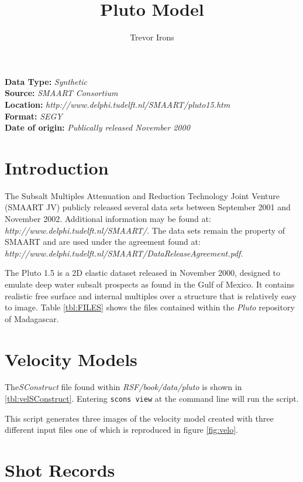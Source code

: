 \title{Pluto Model}
\author{Trevor Irons}

\maketitle
\lstset{language=python,numbers=left,numberstyle=\tiny,showstringspaces=false}
\textbf {Data Type:} \emph{Synthetic}\\
\textbf {Source:} \emph{SMAART Consortium}\\
\textbf {Location:} \emph{http://www.delphi.tudelft.nl/SMAART/pluto15.htm}\\
\textbf {Format:} \emph{SEGY} \\
\textbf{Date of origin:} \emph{Publically released November 2000}\\

\section{Introduction} 
The Subsalt Multiples Attenuation and Reduction Technology Joint Venture (SMAART JV) publicly released several data sets between September 2001 and November 2002.  Additional information may be found at: \emph{http://www.delphi.tudelft.nl/SMAART/}.  The data sets remain the property of SMAART and are used under the agreement found at: \emph{http://www.delphi.tudelft.nl/SMAART/DataReleaseAgreement.pdf}.

The Pluto 1.5 is a 2D elastic dataset released in November 2000, designed to emulate deep water subsalt prospects as found in the Gulf of Mexico. It contains realistic free surface and internal multiples over a structure that is relatively easy to image. Table \ref{tbl:FILES} shows the files contained within the \emph{Pluto} repository of Madagascar.  
 
{
\tiny

\normalsize
}

\section{Velocity Models}
The\emph{SConstruct} file found within \emph{RSF/book/data/pluto} is shown in \ref{tbl:velSConstruct}.  Entering \texttt{scons view} at the command line will run the script.  

{
\tiny

\normalsize
}        

This script generates three images of the velocity model created with three different input files one of which is reproduced in figure \ref{fig:velo}.


\section{Shot Records}

